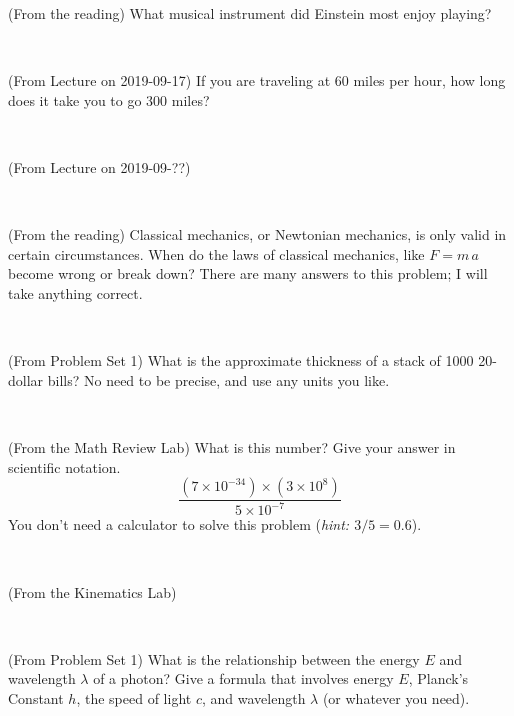\documentclass[12pt, letterpaper]{article}
\begin{document}
\begin{problem} (From the reading)
What musical instrument did Einstein most enjoy playing?
\end{problem}


\vfill ~

\begin{problem} (From Lecture on 2019-09-17)
If you are traveling at 60 miles per hour, how long does
it take you to go 300 miles?
\end{problem}


\vfill ~

\begin{problem} (From Lecture on 2019-09-??)
\end{problem}


\vfill ~

\begin{problem} (From the reading)
Classical mechanics, or Newtonian mechanics, is only valid in certain
circumstances. When do the laws of classical mechanics, like $F =
m\,a$ become wrong or break down? There are many answers to this
problem; I will take anything correct.
\end{problem}


\vfill ~


\clearpage


\begin{problem} (From Problem Set 1)
What is the approximate thickness of a stack of 1000 20-dollar bills?
No need to be precise, and use any units you like.
\end{problem}


\vfill ~

\begin{problem} (From the Math Review Lab)
What is this number? Give your answer in scientific notation.
$$
\frac{(7\times10^{-34})\times(3\times10^8)}{5\times10^{-7}}
$$
You don't need a calculator to solve this problem (\textit{hint: $3/5=0.6$}).
\end{problem}


\vfill ~

\begin{problem} (From the Kinematics Lab)

\end{problem}


\vfill ~

\begin{problem} (From Problem Set 1)
What is the relationship between the energy $E$ and wavelength
$\lambda$ of a photon? Give a formula that involves energy $E$,
Planck's Constant $h$, the speed of light $c$, and wavelength
$\lambda$ (or whatever you need).
\end{problem}
\end{document}
